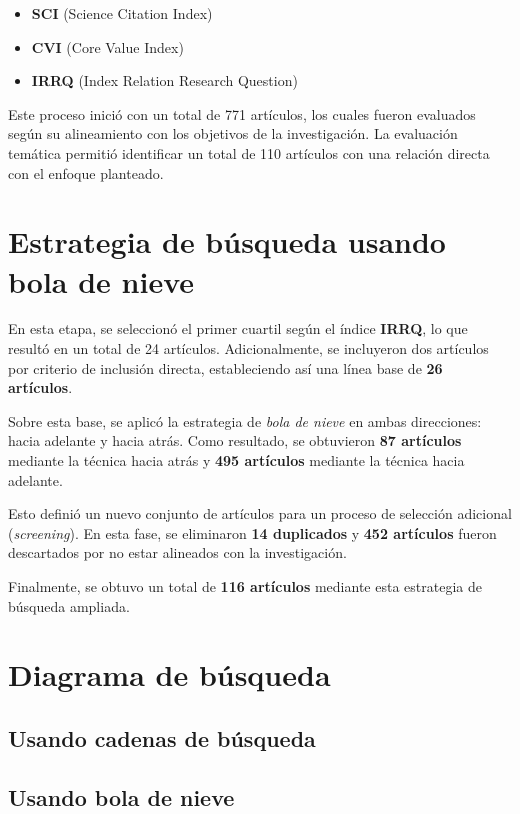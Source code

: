 \begin{itemize}
    \item \textbf{SCI} (Science Citation Index)
    \item \textbf{CVI} (Core Value Index)
    \item \textbf{IRRQ} (Index Relation Research Question)
\end{itemize}

Este proceso inició con un total de 771 artículos, los cuales fueron evaluados según su alineamiento con los objetivos de la investigación. La evaluación temática permitió identificar un total de 110 artículos con una relación directa con el enfoque planteado.

\section{Estrategia de búsqueda usando bola de nieve}\label{sec:bolaDeNieve}

En esta etapa, se seleccionó el primer cuartil según el índice \textbf{IRRQ}, lo que resultó en un total de 24 artículos. Adicionalmente, se incluyeron dos artículos por criterio de inclusión directa, estableciendo así una línea base de \textbf{26 artículos}. 

Sobre esta base, se aplicó la estrategia de \textit{bola de nieve} en ambas direcciones: hacia adelante y hacia atrás. Como resultado, se obtuvieron \textbf{87 artículos} mediante la técnica hacia atrás y \textbf{495 artículos} mediante la técnica hacia adelante. 

Esto definió un nuevo conjunto de artículos para un proceso de selección adicional (\textit{screening}). En esta fase, se eliminaron \textbf{14 duplicados} y \textbf{452 artículos} fueron descartados por no estar alineados con la investigación. 

Finalmente, se obtuvo un total de \textbf{116 artículos} mediante esta estrategia de búsqueda ampliada.

\section{Diagrama de búsqueda}\label{sec:diagramaBusqueda}

\subsection{Usando cadenas de búsqueda}


\subsection{Usando bola de nieve}


